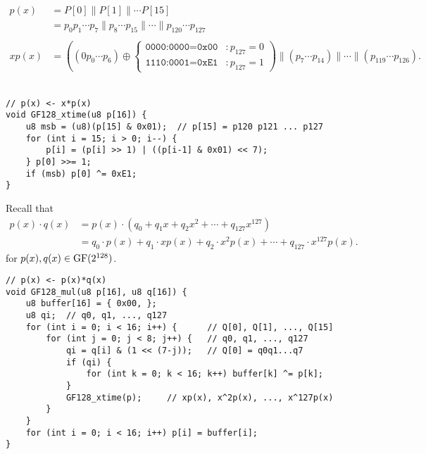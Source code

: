 \begin{align*}
	p(x)&=P[0]\parallel P[1]\parallel\cdots P[15]\\
	&=p_0p_1\cdots p_7\parallel p_8\cdots p_{15}\parallel \cdots\parallel p_{120}\cdots p_{127}\\ \\
	xp(x) &=\left((0p_0\cdots p_6)\oplus \begin{cases}
		\texttt{0000:0000}=\texttt{0x00} &: p_{127}=0\\
		\texttt{1110:0001}=\texttt{0xE1} &: p_{127}=1
	\end{cases}\right)\parallel (p_7\cdots p_{14})\parallel \cdots\parallel (p_{119}\cdots p_{126}).
\end{align*}\\
\begin{lstlisting}[style=c]
// p(x) <- x*p(x)
void GF128_xtime(u8 p[16]) {
	u8 msb = (u8)(p[15] & 0x01);  // p[15] = p120 p121 ... p127
	for (int i = 15; i > 0; i--) {
		p[i] = (p[i] >> 1) | ((p[i-1] & 0x01) << 7);
	} p[0] >>= 1;
	if (msb) p[0] ^= 0xE1;
}
\end{lstlisting}
\vfill
Recall that \begin{align*}
	p(x)\cdot q(x)&=p(x)\cdot\left(q_0+q_1x+q_2x^2+\cdots+q_{127}x^{127}\right)\\
	&=q_0\cdot p(x)+q_1\cdot xp(x)+q_2\cdot x^2p(x)+\cdots +q_{127}\cdot x^{127}p(x).
\end{align*} for $p(x),q(x)\in\normalfont\text{GF}(2^{128})$.\\

\begin{lstlisting}[style=c]
// p(x) <- p(x)*q(x)
void GF128_mul(u8 p[16], u8 q[16]) {
	u8 buffer[16] = { 0x00, };
	u8 qi; 	// q0, q1, ..., q127
	for (int i = 0; i < 16; i++) { 		// Q[0], Q[1], ..., Q[15]
		for (int j = 0; j < 8; j++) { 	// q0, q1, ..., q127
			qi = q[i] & (1 << (7-j)); 	// Q[0] = q0q1...q7
			if (qi) {
				for (int k = 0; k < 16; k++) buffer[k] ^= p[k];
			}
			GF128_xtime(p); 	// xp(x), x^2p(x), ..., x^127p(x)
		}
	}
	for (int i = 0; i < 16; i++) p[i] = buffer[i];
}
\end{lstlisting}

\newpage
